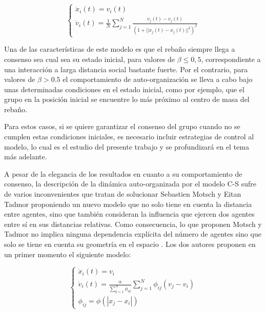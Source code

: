  \begin{equation}
    \left\lbrace
    \begin{array}{ll}
        \dot{x}_{i}(t)=v_{i}(t) \\
        \dot{v}_{i}(t)= \displaystyle{\frac{1}{N}\sum_{j=1}^{N}\frac{v_{j}(t)-v_{j}(t)}{(1+||x_{j}(t)-x_{j}(t)||^2)^\beta}}
    \end{array}
    \right.
\end{equation}
 
Una de las características de este modelo es que el rebaño siempre llega a consenso sea cual sea su estado inicial, para valores de $\beta \leq 0,5$, correspondiente a una interacción a larga distancia social bastante fuerte. Por el contrario, para valores de $\beta >0.5$ el comportamiento de auto-organización se lleva a cabo bajo unas determinadas condiciones en el estado inicial, como por ejemplo, que el grupo en la posición inicial se encuentre lo más próximo al centro de masa del rebaño.

Para estos casos, si se quiere garantizar el consenso del grupo cuando no se cumplen estas condiciones iniciales, es necesario incluir estrategias de control al modelo, lo cual es el estudio del presente trabajo y se profundizará en el tema más adelante. 

A pesar de la elegancia de los resultados en cuanto a su comportamiento de consenso, la descripción de la dinámica auto-organizada por el modelo C-S sufre de varios inconvenientes que tratan de solucionar Sebastien Motsch y Eitan Tadmor proponiendo un nuevo modelo que no solo tiene en cuenta la distancia entre agentes, sino que también consideran la influencia que ejercen dos agentes entre sí en sus distancias relativas. Como consecuencia, lo que proponen Motsch y Tadmor no implica ninguna dependencia explícita del número de agentes sino que solo se tiene en cuenta su geometría en el espacio \cite{motsch2011new}. Los dos autores proponen en un primer momento el siguiente modelo: 

\begin{equation}
    \label{eq:MTmodel1}
    \left\lbrace
    \begin{array}{lll}
        \dot{x}_{i}(t)= v_{i} \\
        \dot{v}_{i}(t)=\displaystyle{\frac{\alpha}{\sum_{k=1}^{N}\phi_{ik}}\sum_{j=1}^{N}\phi_{ij}(v_{j}-v_{i})} \\ 
        \phi_{ij}=\phi(|x_{j}-x_{i}|)
    \end{array}
    \right.
\end{equation}

